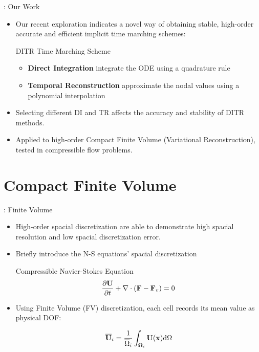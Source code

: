 \documentclass[aspectratio=169,serif]{beamer} %
\begin{document}
\begin{frame}{\secname: Our Work}
  \begin{itemize}
    \item Our recent exploration indicates a novel
          way of obtaining stable, high-order accurate and
          efficient implicit time marching schemes:
          \begin{block}{DITR Time Marching Scheme}
            \begin{itemize}
              \item {\bf Direct Integration}
                    integrate the ODE using a quadrature rule
              \item {\bf Temporal Reconstruction}
                    approximate the nodal values using a polynomial
                    interpolation
            \end{itemize}
          \end{block}
    \item Selecting different DI and TR affects
          the accuracy and stability of DITR methods.
    \item Applied to high-order Compact Finite Volume
          (Variational Reconstruction), tested in compressible
          flow problems.
  \end{itemize}
\end{frame}

\section{Compact Finite Volume}
\label{sec:CFV}

\begin{frame}{\secname: Finite Volume}
  \begin{itemize}
    \item High-order spacial discretization are able to demonstrate
          high spacial resolution and low spacial discretization error.
    \item
          Briefly introduce the N-S equations' spacial discretization
          \begin{block}{Compressible Navier-Stokes Equation}
            \begin{equation}
              \label{eq:NS}
              \frac{\partial \mathbf{U}}{\partial t} +
              \mathbf\nabla \cdot (\mathbf{F} - \mathbf{F}_v)  = 0
            \end{equation}
          \end{block}
    \item Using Finite Volume (FV) discretization, each
          cell records its mean value as physical DOF:
          \begin{block}{}
            \begin{equation}
              \label{eq:FVMean}
              \overline{\mathbf{U}}_i = \frac{1}{\overline{\Omega}_i}\int_{\mathbf{\Omega}_i}\mathbf{U}(\mathbf{x})\dd \Omega
            \end{equation}
          \end{block}
  \end{itemize}
\end{frame}
\end{document}
